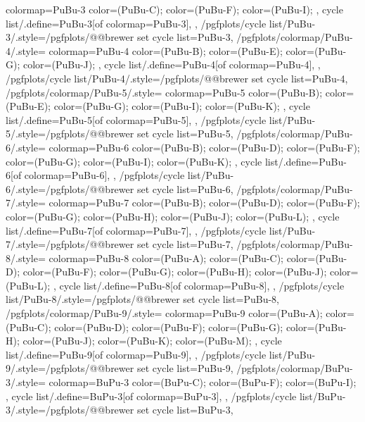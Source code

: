 {{    colormap={PuBu-3}{
      color=(PuBu-C);
      color=(PuBu-F);
      color=(PuBu-I);
    },
    cycle list/.define={PuBu-3}{[of colormap=PuBu-3]},
  },
  /pgfplots/cycle list/PuBu-3/.style={/pgfplots/@@brewer set cycle list={PuBu-3}},
  /pgfplots/colormap/PuBu-4/.style={
    colormap={PuBu-4}{
      color=(PuBu-B);
      color=(PuBu-E);
      color=(PuBu-G);
      color=(PuBu-J);
    },
    cycle list/.define={PuBu-4}{[of colormap=PuBu-4]},
  },
  /pgfplots/cycle list/PuBu-4/.style={/pgfplots/@@brewer set cycle list={PuBu-4}},
  /pgfplots/colormap/PuBu-5/.style={
    colormap={PuBu-5}{
      color=(PuBu-B);
      color=(PuBu-E);
      color=(PuBu-G);
      color=(PuBu-I);
      color=(PuBu-K);
    },
    cycle list/.define={PuBu-5}{[of colormap=PuBu-5]},
  },
  /pgfplots/cycle list/PuBu-5/.style={/pgfplots/@@brewer set cycle list={PuBu-5}},
  /pgfplots/colormap/PuBu-6/.style={
    colormap={PuBu-6}{
      color=(PuBu-B);
      color=(PuBu-D);
      color=(PuBu-F);
      color=(PuBu-G);
      color=(PuBu-I);
      color=(PuBu-K);
    },
    cycle list/.define={PuBu-6}{[of colormap=PuBu-6]},
  },
  /pgfplots/cycle list/PuBu-6/.style={/pgfplots/@@brewer set cycle list={PuBu-6}},
  /pgfplots/colormap/PuBu-7/.style={
    colormap={PuBu-7}{
      color=(PuBu-B);
      color=(PuBu-D);
      color=(PuBu-F);
      color=(PuBu-G);
      color=(PuBu-H);
      color=(PuBu-J);
      color=(PuBu-L);
    },
    cycle list/.define={PuBu-7}{[of colormap=PuBu-7]},
  },
  /pgfplots/cycle list/PuBu-7/.style={/pgfplots/@@brewer set cycle list={PuBu-7}},
  /pgfplots/colormap/PuBu-8/.style={
    colormap={PuBu-8}{
      color=(PuBu-A);
      color=(PuBu-C);
      color=(PuBu-D);
      color=(PuBu-F);
      color=(PuBu-G);
      color=(PuBu-H);
      color=(PuBu-J);
      color=(PuBu-L);
    },
    cycle list/.define={PuBu-8}{[of colormap=PuBu-8]},
  },
  /pgfplots/cycle list/PuBu-8/.style={/pgfplots/@@brewer set cycle list={PuBu-8}},
  /pgfplots/colormap/PuBu-9/.style={
    colormap={PuBu-9}{
      color=(PuBu-A);
      color=(PuBu-C);
      color=(PuBu-D);
      color=(PuBu-F);
      color=(PuBu-G);
      color=(PuBu-H);
      color=(PuBu-J);
      color=(PuBu-K);
      color=(PuBu-M);
    },
    cycle list/.define={PuBu-9}{[of colormap=PuBu-9]},
  },
  /pgfplots/cycle list/PuBu-9/.style={/pgfplots/@@brewer set cycle list={PuBu-9}},
  /pgfplots/colormap/BuPu-3/.style={
    colormap={BuPu-3}{
      color=(BuPu-C);
      color=(BuPu-F);
      color=(BuPu-I);
    },
    cycle list/.define={BuPu-3}{[of colormap=BuPu-3]},
  },
  /pgfplots/cycle list/BuPu-3/.style={/pgfplots/@@brewer set cycle list={BuPu-3}},
}
